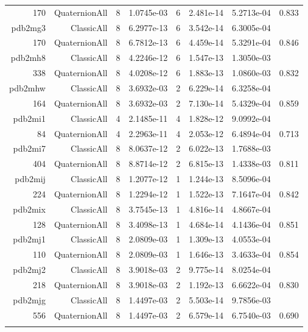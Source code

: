 \begin{xltabular}{\textwidth}{r|rcS[table-format=1.4e+2]cS[table-format=1.3e+2]S[table-format=1.4e+2]S[table-format=-1.3]}
170 & QuaternionAll & 8 & 1.0745e-03 & 6 & 2.481e-14 & 5.2713e-04 & 0.833\\  \addlinespace
pdb2mg3 & ClassicAll & 8 & 6.2977e-13 & 6 & 3.542e-14 & 6.3005e-04 & \\
170 & QuaternionAll & 8 & 6.7812e-13 & 6 & 4.459e-14 & 5.3291e-04 & 0.846\\  \addlinespace
pdb2mh8 & ClassicAll & 8 & 4.2246e-12 & 6 & 1.547e-13 & 1.3050e-03 & \\
338 & QuaternionAll & 8 & 4.0208e-12 & 6 & 1.883e-13 & 1.0860e-03 & 0.832\\  \addlinespace
pdb2mhw & ClassicAll & 8 & 3.6932e-03 & 2 & 6.229e-14 & 6.3258e-04 & \\
164 & QuaternionAll & 8 & 3.6932e-03 & 2 & 7.130e-14 & 5.4329e-04 & 0.859\\  \addlinespace
pdb2mi1 & ClassicAll & 4 & 2.1485e-11 & 4 & 1.828e-12 & 9.0992e-04 & \\
84 & QuaternionAll & 4 & 2.2963e-11 & 4 & 2.053e-12 & 6.4894e-04 & 0.713\\  \addlinespace
pdb2mi7 & ClassicAll & 8 & 8.0637e-12 & 2 & 6.022e-13 & 1.7688e-03 & \\
404 & QuaternionAll & 8 & 8.8714e-12 & 2 & 6.815e-13 & 1.4338e-03 & 0.811\\  \addlinespace
pdb2mij & ClassicAll & 8 & 1.2077e-12 & 1 & 1.244e-13 & 8.5096e-04 & \\
224 & QuaternionAll & 8 & 1.2294e-12 & 1 & 1.522e-13 & 7.1647e-04 & 0.842\\  \addlinespace
pdb2mix & ClassicAll & 8 & 3.7545e-13 & 1 & 4.816e-14 & 4.8667e-04 & \\
128 & QuaternionAll & 8 & 3.4098e-13 & 1 & 4.684e-14 & 4.1436e-04 & 0.851\\  \addlinespace
pdb2mj1 & ClassicAll & 8 & 2.0809e-03 & 1 & 1.309e-13 & 4.0553e-04 & \\
110 & QuaternionAll & 8 & 2.0809e-03 & 1 & 1.646e-13 & 3.4633e-04 & 0.854\\  \addlinespace
pdb2mj2 & ClassicAll & 8 & 3.9018e-03 & 2 & 9.775e-14 & 8.0254e-04 & \\
218 & QuaternionAll & 8 & 3.9018e-03 & 2 & 1.192e-13 & 6.6622e-04 & 0.830\\  \addlinespace
pdb2mjg & ClassicAll & 8 & 1.4497e-03 & 2 & 5.503e-14 & 9.7856e-03 & \\
556 & QuaternionAll & 8 & 1.4497e-03 & 2 & 6.579e-14 & 6.7540e-03 & 0.690\\  \addlinespace

\end{xltabular}
